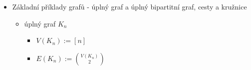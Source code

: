 \begin{itemize}
\begin{itemize}
\begin{itemize}
\item okolí vrcholu $v$ jsou ty vrcholy, které s vrcholem $v$ sousedí (sdílejí hranu)
\item $N_G(v)=\set{u\in V(G):\exists uv\in E(G)}$
\end{itemize}
\item stupeň vrcholu
\begin{itemize}
\item stupeň vrcholu - počet hran, kterých se účastní daný vrchol
\item graf je k-regulární, pokud je stupeň všech vrcholů grafu roven k
\item skóre grafu = posloupnost stupňů vrcholů (až na pořadí) $\to$ jakmile dvěma grafům vyjde jiné skóre, nemohou být izomorfní
\end{itemize}
\item doplněk grafu
\begin{itemize}
\item doplněk/komplement grafu $G$ je graf $G_0$, který má stejné vrcholy jako $G$, ale má právě ty hrany, které v grafu $G$ chybí
\end{itemize}
\item bipartitní graf
\begin{itemize}
\item graf (V, E) je bipartitní $\equiv \exists L,P\subseteq V$ t. ž.:
\begin{itemize}
\item $L \cup P = V$
\item $L \cap P = \emptyset$
\item $\forall e \in E: |e \cap L| = 1\quad (\land\ |e \cap P| = 1)$
\begin{itemize}
\item nebo $E(G)\subseteq\lbrace\lbrace x,y\rbrace\mid x\in L,y\in P\rbrace$
\end{itemize}
\end{itemize}
\item partity grafu - jednotlivé \quotedblbase{}strany\textquotedblleft{}
\end{itemize}
\end{itemize}
\item Základní příklady grafů - úplný graf a úplný bipartitní graf, cesty a kružnice
\begin{itemize}
\item úplný graf $K_n$
\begin{itemize}
\item $V(K_n):=[n]$
\item $E(K_n):={V(K_n)\choose 2}$

\end{itemize}
\end{itemize}
\end{itemize}
